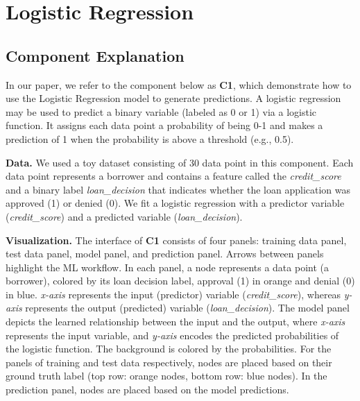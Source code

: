 \section{Logistic Regression}

\subsection{Component Explanation}

\par In our paper, we refer to the component below as \textbf{C1}, which demonstrate how to use the Logistic Regression model to generate predictions. 
A logistic regression may be used to predict a binary variable (labeled as 0 or 1) via a logistic function. 
It assigns each data point a probability of being 0-1 and makes a prediction of 1 when the probability is above a threshold (e.g., 0.5).

\begin{visualComponent}
\end{visualComponent}

\textbf{Data.} We used a toy dataset consisting of 30 data point in this component. 
Each data point represents a borrower and contains a feature called the \emph{credit\_score} and a binary label \emph{loan\_decision} that indicates whether the loan application was approved (1) or denied (0). We fit a logistic regression with a predictor variable (\emph{credit\_score}) and a predicted variable (\emph{loan\_decision}). 

\textbf{Visualization.} The interface of \textbf{C1} consists of four panels: training data panel, test data panel, model panel, and prediction panel. Arrows between panels highlight the ML workflow. In each panel, a node represents a data point (a borrower), colored by its loan decision label, approval (1) in orange and denial (0) in blue. \emph{x-axis} represents the input (predictor) variable (\emph{credit\_score}), whereas \emph{y-axis} represents the output (predicted) variable (\emph{loan\_decision}). The model panel depicts the learned relationship between the input and the output, where \emph{x-axis} represents the input variable, and \emph{y-axis} encodes the predicted probabilities of the logistic function. The background is colored by the probabilities. For the panels of training and test data respectively, nodes are placed based on their ground truth label (top row: orange nodes, bottom row: blue nodes). In the prediction panel, nodes are placed based on the model predictions. 

